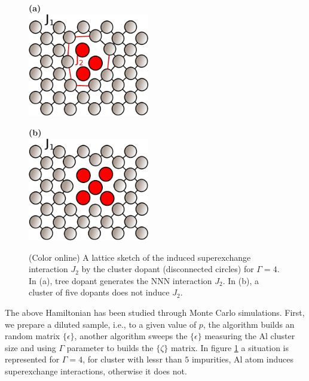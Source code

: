 \documentclass[twocolumn,5p,12pt]{elsarticle}
\begin{document}
\begin{figure}[!t]
  \centering
   \hspace{0.8cm}
 {\scriptsize\textbf{(a)}}\\
   \includegraphics[height=4.5cm]{fig1a.eps}
\end{figure}
\begin{figure}[!t]
   \centering
   \hspace{0.8cm}
 {\scriptsize\textbf{(b)}}\\
   \includegraphics[height=4.5cm]{fig1b.eps}
\caption{(Color online) A lattice sketch of the induced superexchange interaction $J_2$ by the cluster dopant (disconnected
 circles) for $\Gamma=4$. In (a), tree dopant generates the NNN interaction $J_2$. In (b), a cluster of five dopants does not induce $J_2$.}
\label{fig0}
\end{figure}

%
The above Hamiltonian has been studied through Monte Carlo simulations. First, we prepare a diluted sample, i.e., to a given value of $p$, the algorithm builds an random matrix $\{\epsilon \}$, another algorithm sweeps the $\{\epsilon \}$ measuring the Al cluster size and using $\Gamma$ parameter to builds the $\{\zeta\}$ matrix. In figure \ref{fig0} a situation is represented for $\Gamma = 4 $, for cluster with lessr than $5$ impurities, Al atom induces superexchange interactions, otherwise it does not.
%
\end{document}
